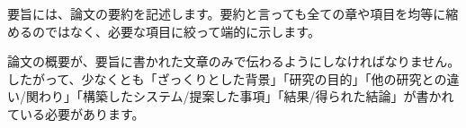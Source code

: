 要旨には、論文の要約を記述します。要約と言っても全ての章や項目を均等に縮めるのではなく、必要な項目に絞って端的に示します。

論文の概要が、要旨に書かれた文章のみで伝わるようにしなければなりません。
したがって、少なくとも「ざっくりとした背景」「研究の目的」「他の研究との違い/関わり」「構築したシステム/提案した事項」「結果/得られた結論」が書かれている必要があります。